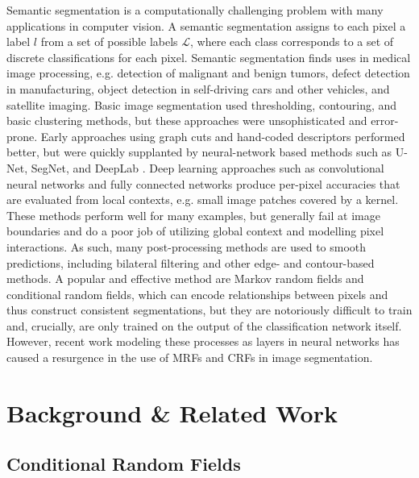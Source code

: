 \documentclass[10pt,twocolumn,letterpaper]{article}
\begin{document}
Semantic segmentation is a computationally challenging problem with many applications in computer vision. 
A semantic segmentation assigns to each pixel a label $l$ from a set of possible labels $\mathcal{L}$, where each class corresponds to a set of discrete classifications for each pixel.
Semantic segmentation finds uses in medical image processing, e.g. detection of malignant and benign tumors, defect detection in manufacturing, object detection in self-driving cars
and other vehicles, and satellite imaging. 
Basic image segmentation used thresholding, contouring, and basic clustering methods, but these approaches were unsophisticated and error-prone. 
Early approaches using graph cuts and hand-coded descriptors performed better, but were quickly supplanted by neural-network based methods such as U-Net, SegNet, and DeepLab \cite{ulku2019survey}. 
Deep learning approaches such as convolutional neural networks and fully connected networks produce per-pixel accuracies that are evaluated from local contexts, e.g. small image patches 
covered by a kernel. These methods perform well for many examples, but generally fail at image boundaries and do a poor job of utilizing global context and modelling pixel interactions. 
As such, many post-processing methods are used to smooth predictions, including bilateral filtering and other edge- and contour-based methods.
A popular and effective method are Markov random fields and conditional random fields, which can encode relationships between pixels and thus construct consistent segmentations,
but they are notoriously difficult to train and, crucially, are only trained on the output of the classification network itself. However, recent work modeling these processes as 
layers in neural networks has caused a resurgence in the use of MRFs and CRFs in image segmentation.

\section{Background \& Related Work}

\subsection{Conditional Random Fields}
\end{document}
